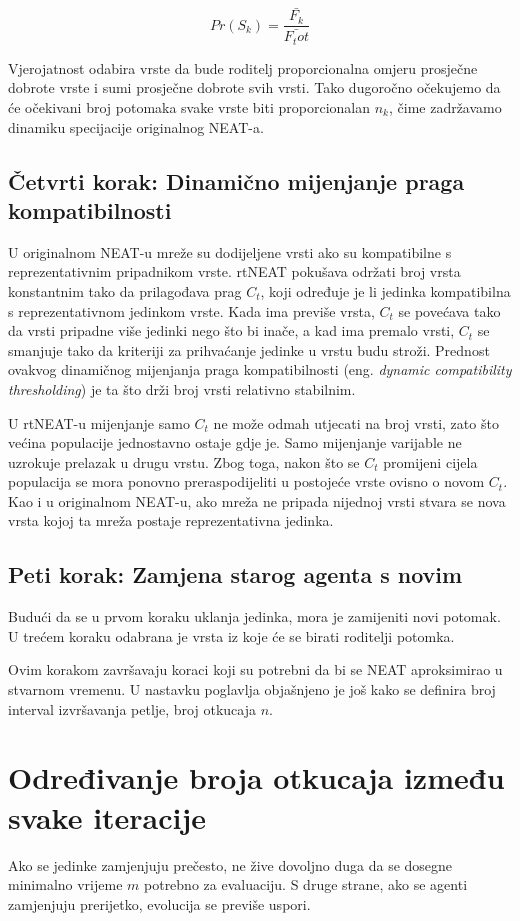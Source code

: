 \documentclass[times, utf8, seminar, numeric]{fer}
\begin{document}
\begin{equation}
Pr(S_k) = \frac{\bar{F_k}}{\bar{F_tot}}
\label{jednakost3}
\end{equation}

Vjerojatnost odabira vrste da bude roditelj proporcionalna omjeru prosječne dobrote vrste i sumi prosječne dobrote svih vrsti. Tako dugoročno očekujemo da će očekivani broj potomaka svake vrste biti proporcionalan $n_k$, čime zadržavamo dinamiku specijacije originalnog NEAT-a.

\subsection{Četvrti korak: Dinamično mijenjanje praga kompatibilnosti}
U originalnom NEAT-u mreže su dodijeljene vrsti ako su kompatibilne s reprezentativnim pripadnikom vrste. rtNEAT pokušava održati broj vrsta konstantnim tako da prilagođava prag $C_t$, koji određuje je li jedinka kompatibilna s reprezentativnom jedinkom vrste. Kada ima previše vrsta, $C_t$ se povećava tako da vrsti pripadne više jedinki nego što bi inače, a kad ima premalo vrsti, $C_t$ se smanjuje tako da kriteriji za prihvaćanje jedinke u vrstu budu stroži. Prednost ovakvog dinamičnog mijenjanja praga kompatibilnosti (eng. \textit{dynamic compatibility thresholding}) je ta što drži broj vrsti relativno stabilnim.

U rtNEAT-u mijenjanje samo $C_t$ ne može odmah utjecati na broj vrsti, zato što većina populacije jednostavno ostaje gdje je. Samo mijenjanje varijable ne uzrokuje prelazak u drugu vrstu. Zbog toga, nakon što se $C_t$ promijeni cijela populacija se mora ponovno preraspodijeliti u postojeće vrste ovisno o novom $C_t$. Kao i u originalnom NEAT-u, ako mreža ne pripada nijednoj vrsti stvara se nova vrsta kojoj ta mreža postaje reprezentativna jedinka.

\subsection{Peti korak: Zamjena starog agenta s novim}
Budući da se u prvom koraku uklanja jedinka, mora je zamijeniti novi potomak. U trećem koraku odabrana je vrsta iz koje će se birati roditelji potomka.

Ovim korakom završavaju koraci koji su potrebni da bi se NEAT aproksimirao u stvarnom vremenu. U nastavku poglavlja objašnjeno je još kako se definira broj interval izvršavanja petlje, broj otkucaja $n$.

\section{Određivanje broja otkucaja između svake iteracije}
Ako se jedinke zamjenjuju prečesto, ne žive dovoljno duga da se dosegne minimalno vrijeme $m$ potrebno za evaluaciju. S druge strane, ako se agenti zamjenjuju prerijetko, evolucija se previše uspori.
\end{document}
